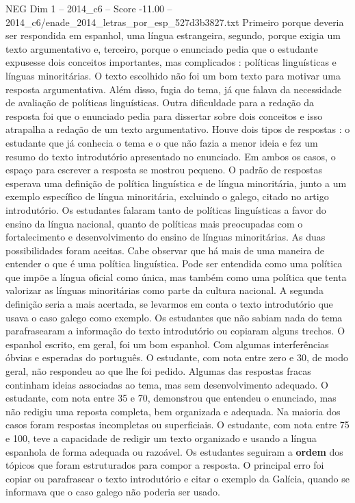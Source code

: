 \begin{textsample}{NEG Dim 1 – 2014\_c6 – Score -11.00 – 2014\_c6/enade\_2014\_letras\_por\_esp\_527d3b3827.txt}
Primeiro porque deveria ser respondida em espanhol, uma língua estrangeira, segundo, porque exigia um texto argumentativo e, terceiro, porque o enunciado pedia que o estudante expusesse dois conceitos importantes, mas complicados : políticas linguísticas e línguas minoritárias.
O texto escolhido não foi um bom texto para motivar uma resposta argumentativa.
Além disso, fugia do tema, já que falava da necessidade de avaliação de políticas linguísticas.
Outra dificuldade para a redação da resposta foi que o enunciado pedia para dissertar sobre dois conceitos e isso atrapalha a redação de um texto argumentativo.
Houve dois tipos de respostas : o estudante que já conhecia o tema e o que não fazia a menor ideia e fez um resumo do texto introdutório apresentado no enunciado.
Em ambos os casos, o espaço para escrever a resposta se mostrou pequeno.
O padrão de respostas esperava uma definição de política linguística e de língua minoritária, junto a um exemplo específico de língua minoritária, excluindo o galego, citado no artigo introdutório.
Os estudantes falaram tanto de políticas linguísticas a favor do ensino da língua nacional, quanto de políticas mais preocupadas com o fortalecimento e desenvolvimento do ensino de línguas minoritárias.
As duas possibilidades foram aceitas.
Cabe observar que há mais de uma maneira de entender o que é uma política linguística.
Pode ser entendida como uma política que impõe a língua oficial como única, mas também como uma política que tenta valorizar as línguas minoritárias como parte da cultura nacional.
A segunda definição seria a mais acertada, se levarmos em conta o texto introdutório que usava o caso galego como exemplo.
Os estudantes que não sabiam nada do tema parafrasearam a informação do texto introdutório ou copiaram alguns trechos.
O espanhol escrito, em geral, foi um bom espanhol.
Com algumas interferências óbvias e esperadas do português.
O estudante, com nota entre zero e 30, de modo geral, não respondeu ao que lhe foi pedido.
Algumas das respostas fracas continham ideias associadas ao tema, mas sem desenvolvimento adequado.
O estudante, com nota entre 35 e 70, demonstrou que entendeu o enunciado, mas não redigiu uma reposta completa, bem organizada e adequada.
Na maioria dos casos foram respostas incompletas ou superficiais.
O estudante, com nota entre 75 e 100, teve a capacidade de redigir um texto organizado e usando a língua espanhola de forma adequada ou razoável.
Os estudantes seguiram a \textbf{ordem} dos tópicos que foram estruturados para compor a resposta.
O principal erro foi copiar ou parafrasear o texto introdutório e citar o exemplo da Galícia, quando se informava que o caso galego não poderia ser usado.

\end{textsample}
